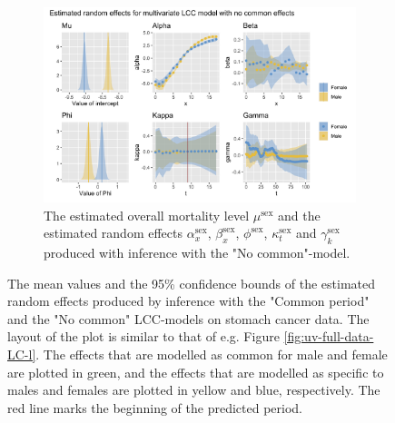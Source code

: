 \begin{figure}[h!]
    \begin{subfigure}[b]{.75\linewidth}
        \includegraphics[width=\linewidth]{real-data/real-data-multivariate/Figures/effects-LCC-no-common-stomach.png}
        \caption{The estimated overall mortality level $\mu^{\text{sex}}$ and the estimated random effects $\alpha_x^{\text{sex}}$, $\beta_x^{\text{sex}}$, $\phi^{\text{sex}}$, $\kappa_t^{\text{sex}}$ and $\gamma_k^{\text{sex}}$ produced with inference with the "No common"-model.}
        \label{fig:effects-LCC-stomach-bottom}
    \end{subfigure}
    \caption{The mean values and the 95\% confidence bounds of the estimated random effects produced by inference with the "Common period" and the "No common" LCC-models on stomach cancer data. The layout of the plot is similar to that of e.g. Figure \ref{fig:uv-full-data-LC-l}. The effects that are modelled as common for male and female are plotted in green, and the effects that are modelled as specific to males and females are plotted in yellow and blue, respectively. The red line marks the beginning of the predicted period. }
    \label{fig:effects-LCC-stomach}
\end{figure}